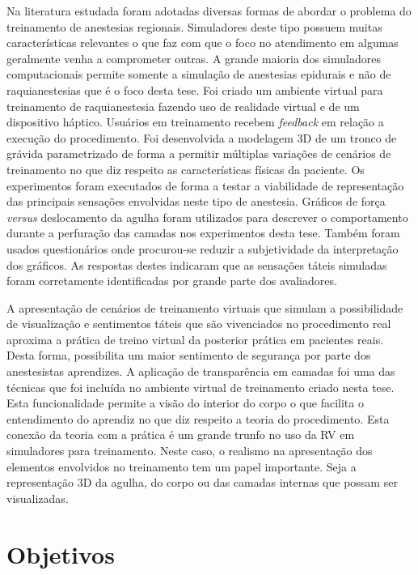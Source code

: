 Na literatura estudada foram adotadas diversas formas de abordar o problema do treinamento de anestesias regionais. Simuladores deste tipo possuem muitas características relevantes o que faz com que o foco no atendimento em algumas geralmente venha a comprometer outras. A grande maioria dos simuladores computacionais permite somente a simulação de anestesias epidurais e não de raquianestesias que é o foco desta tese. Foi criado um ambiente virtual para treinamento de raquianestesia fazendo uso de realidade virtual e de um dispositivo háptico. Usuários em treinamento recebem \textit{feedback} em relação a execução do procedimento. Foi desenvolvida a modelagem 3D de um tronco de grávida parametrizado de forma a permitir múltiplas variações de cenários de treinamento no que diz respeito as características físicas da paciente. Os experimentos foram executados de forma a testar a viabilidade de representação das principais sensações envolvidas neste tipo de anestesia. Gráficos de força \textit{versus} deslocamento da agulha foram utilizados para descrever o comportamento durante a perfuração das camadas nos experimentos desta tese. Também foram usados questionários onde procurou-se reduzir a subjetividade da interpretação dos gráficos. As respostas destes indicaram que as sensações táteis simuladas foram corretamente identificadas por grande parte dos avaliadores. 

A apresentação de cenários de treinamento virtuais que simulam a possibilidade de visualização e sentimentos táteis que são vivenciados no procedimento real aproxima a prática de treino virtual da posterior prática em pacientes reais. Desta forma, possibilita um maior sentimento de segurança por parte dos anestesistas aprendizes. A aplicação de transparência em camadas foi uma das técnicas que foi incluída no ambiente virtual de treinamento criado nesta tese. Esta funcionalidade permite a visão do interior do corpo o que facilita o entendimento do aprendiz no que diz respeito a teoria do procedimento. Esta conexão da teoria com a prática é um grande trunfo no uso da \acrfull{RV} em simuladores para treinamento. Neste caso, o realismo na apresentação dos elementos envolvidos no treinamento tem um papel importante. Seja a representação 3D da agulha, do corpo ou das camadas internas que possam ser visualizadas. 

\section{Objetivos}
\label{sec:objetivos}

